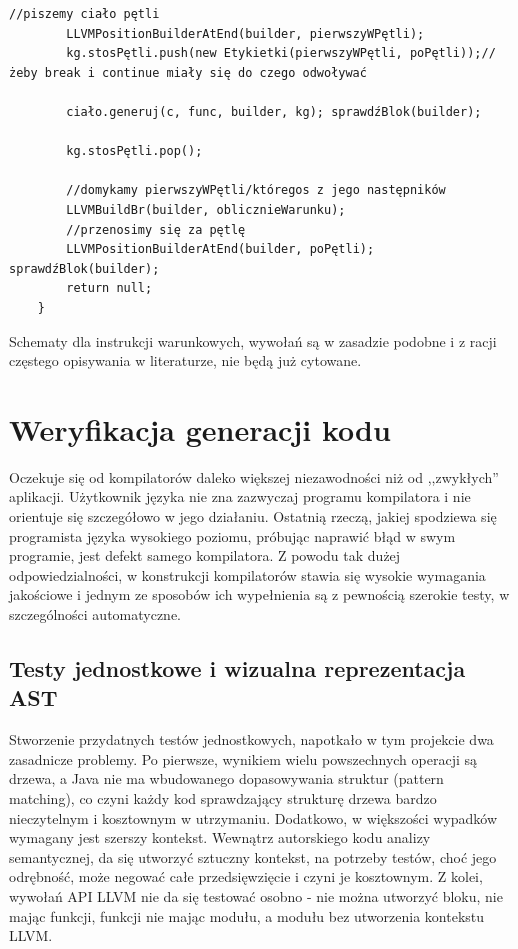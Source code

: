 \begin{lstlisting}[basicstyle=\scriptsize]
        //piszemy ciało pętli
        LLVMPositionBuilderAtEnd(builder, pierwszyWPętli);
        kg.stosPętli.push(new Etykietki(pierwszyWPętli, poPętli));//żeby break i continue miały się do czego odwoływać

        ciało.generuj(c, func, builder, kg); sprawdźBlok(builder);

        kg.stosPętli.pop();

        //domykamy pierwszyWPętli/któregos z jego następników
        LLVMBuildBr(builder, oblicznieWarunku);
        //przenosimy się za pętlę
        LLVMPositionBuilderAtEnd(builder, poPętli); sprawdźBlok(builder);
        return null;
    }
\end{lstlisting}

Schematy dla instrukcji warunkowych, wywołań są w zasadzie podobne i z racji częstego opisywania w literaturze, nie będą już cytowane.
\newpage

\section{Weryfikacja generacji kodu}
Oczekuje się od kompilatorów daleko większej niezawodności niż od ,,zwykłych'' aplikacji\cite{waite_goos}. Użytkownik języka nie zna zazwyczaj programu kompilatora i nie orientuje się szczegółowo w jego działaniu. Ostatnią rzeczą, jakiej spodziewa się programista języka wysokiego poziomu, próbując naprawić błąd w swym programie, jest defekt samego kompilatora. Z powodu tak dużej odpowiedzialności, w konstrukcji kompilatorów stawia się wysokie wymagania jakościowe i jednym ze sposobów ich wypełnienia są z pewnością szerokie testy, w szczególności automatyczne.

\subsection{Testy jednostkowe i wizualna reprezentacja AST}
Stworzenie przydatnych testów jednostkowych, napotkało w tym projekcie dwa zasadnicze problemy. Po pierwsze, wynikiem wielu powszechnych operacji są drzewa, a Java nie ma wbudowanego dopasowywania struktur (pattern matching), co czyni każdy kod sprawdzający strukturę drzewa bardzo nieczytelnym i kosztownym w utrzymaniu. Dodatkowo, w większości wypadków wymagany jest szerszy kontekst. Wewnątrz autorskiego kodu analizy semantycznej, da się utworzyć sztuczny kontekst, na potrzeby testów, choć jego odrębność, może negować całe przedsięwzięcie i czyni je kosztownym. Z kolei, wywołań API LLVM nie da się testować osobno - nie można utworzyć bloku, nie mając funkcji, funkcji nie mając modułu, a modułu bez utworzenia kontekstu LLVM.

